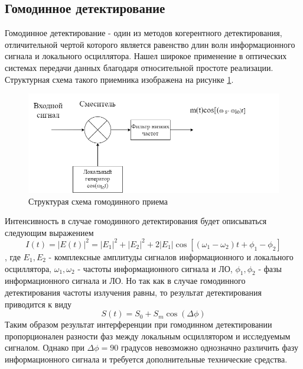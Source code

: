 \subsection{Гомодинное детектирование}\label{sec:ch1/sect3/homodyne lit}
Гомодинное детектирование - один из методов когерентного детектирования, отличительной чертой которого является равенство длин волн информационного сигнала и локального осциллятора. Нашел широкое применение в оптических системах передачи данных благодаря относительной простоте реализации. Структурная схема такого приемника изображена на рисунке \ref{fig:homodyne det lit}. 
\begin{figure}
    \centering
    \includegraphics[width=\linewidth]{images/когеретное.png}
    \caption{Структурая схема гомодинного приема}
    \label{fig:homodyne det lit}
\end{figure}

Интенсивность в случае гомодинного детектирования будет описываться следующим выражением
\begin{equation}
    I(t) =|E(t)|^2 =  |E_1|^2 + |E_2|^2 + 2|E_1|\cos[(\omega_1 - \omega_2)t + \phi_1 - \phi_2]
\end{equation}\label{eq: fiedl homodyne}, где $E_1, E_2$ - комплексные амплитуды сигналов информационного и локального осциллятора, $\omega_1, \omega_2$ - частоты информационного сигнала и ЛО, $\phi_1, \phi_2$ - фазы информационного сигнала и ЛО. 
Но так как в случае гомодинного детектирования частоты излучения равны, то результат детектирования приводится к виду 
\begin{equation}
    S(t) = S_0 + S_m\cos(\Delta\phi)
\end{equation}
Таким образом результат интерференции при гомодинном детектировании пропорционален разности фаз между локальным осциллятором и исследуемым сигналом. Однако при $\Delta\phi = 90$ градусов невозможно однозначно различить фазу информационного сигнала и требуется дополнительные технические средства.  
